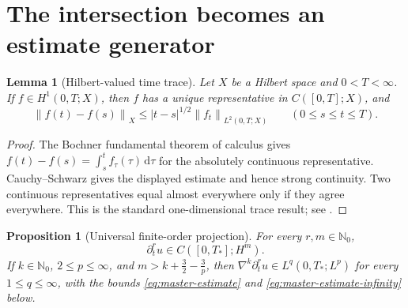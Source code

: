 \documentclass[11pt,letterpaper]{article}
\newtheorem{lemma}[theorem]{Lemma}
\newtheorem{proposition}[theorem]{Proposition}
\theoremstyle{definition}
\theoremstyle{remark}
\newcommand{\Nzero}{\mathbb N_0}
\newcommand{\norm}[1]{\left\lVert #1\right\rVert}
\newcommand{\dd}{\,\mathrm d}
\begin{document}
\section{The intersection becomes an estimate generator}

\begin{lemma}[Hilbert-valued time trace]
\label{lem:hilbert-time-trace}
Let \(X\) be a Hilbert space and \(0<T<\infty\).  If
\(f\in H^1(0,T;X)\), then \(f\) has a unique representative in
\(C([0,T];X)\), and
\[
\norm{f(t)-f(s)}_X
\le |t-s|^{1/2}\norm{f_t}_{L^2(0,T;X)}
\qquad(0\le s\le t\le T).
\]
\end{lemma}

\begin{proof}
The Bochner fundamental theorem of calculus gives
\(f(t)-f(s)=\int_s^t f_\tau(\tau)\dd\tau\) for the absolutely continuous
representative.  Cauchy--Schwarz gives the displayed estimate and hence
strong continuity.  Two continuous representatives equal almost everywhere
only if they agree everywhere.  This is the standard one-dimensional trace
result; see \cite{LionsMagenes1972}.
\end{proof}

\begin{proposition}[Universal finite-order projection]
\label{prop:universal-projection}
For every \(r,m\in\Nzero\),
\[
\partial_t^r u\in C([0,T_*];H^m).
\]
If \(k\in\Nzero\), \(2\le p\le\infty\), and
\(m>k+\frac32-\frac3p\), then
\(\nabla^k\partial_t^r u\in L^q(0,T_*;L^p)\) for every
\(1\le q\le\infty\), with the bounds
\eqref{eq:master-estimate} and \eqref{eq:master-estimate-infinity} below.
\end{proposition}
\end{document}
